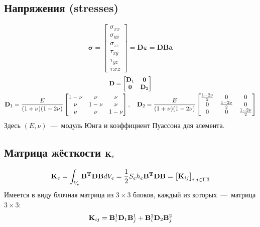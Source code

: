 \documentclass[12pt,a4paper,fleqn]{article}
\begin{document}
	\subsection{Напряжения (stresses)}
		\begin{equation}
			\mathbf{\sigma} = \begin{bmatrix} \sigma_{xx} \\ \sigma_{yy} \\ \sigma_{zz} \\ \tau_{xy} \\ \tau_{yz} \\ \tau{xz}  \end{bmatrix} 
				= \mathbf{D \varepsilon} = \mathbf{DBa}
		\end{equation}
		\begin{gather}
			\mathbf{D} = 
				\begin{bmatrix}
					\mathbf{D}_1 	& \mathbf{0}	\\
					\mathbf{0}	& \mathbf{D}_2
				\end{bmatrix} \\ \notag
			\mathbf{D}_1 = \frac{E}{(1 + \nu)(1 - 2\nu)}
				\begin{bmatrix}
					1 - \nu 	& \nu 		& \nu \\
					\nu 		& 1 - \nu  	& \nu \\
					\nu		& \nu		& 1 - \nu
				\end{bmatrix}, \quad
			\mathbf{D}_2 = \frac{E}{(1 + \nu)(1 - 2\nu)}
				\begin{bmatrix}
					\frac{1-2\nu}2 	& 0 		& 0 \\
					0 		& \frac{1-2\nu}2& 0 \\
					0		& 0		& \frac{1-2\nu}2
				\end{bmatrix}
		\end{gather}
		Здесь $(E, \nu)$~---~модуль Юнга и коэффициент Пуассона для элемента.
	\subsection{Матрица жёсткости $\mathbf{K}_e$}
		\begin{equation}
			\mathbf{K}_e = \int_{V_e}{\mathbf{B^TDB}}dV_e = \frac12 S_e h_e 	\mathbf{B^TDB} 
				= \begin{bmatrix}
					\mathbf{K}_{ij}
					\end{bmatrix}_{i, j \in \overline{1,3}}
		\end{equation}
		Имеется в виду блочная матрица из $3\times3$ блоков, каждый из которых~---~матрица $3\times3$:
		\begin{equation}
			\mathbf{K}_{ij} = \mathbf{B}_i^1\mathbf{D}_1\mathbf{B}_j^1 +
						\mathbf{B}_i^2\mathbf{D}_2\mathbf{B}_j^2 
		\end{equation}
\end{document}

